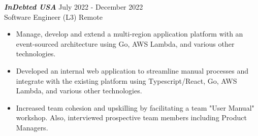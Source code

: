 {\sl \textbf{InDebted USA}} \hfill July 2022 - December 2022 \\ Software Engineer (L3) \hfill Remote
\begin{itemize}
    \item Manage, develop and extend a multi-region application platform with an event-sourced architecture using Go, AWS Lambda, and various other technologies.
    \item Developed an internal web application to streamline manual processes and integrate with the existing platform using Typescript/React, Go, AWS Lambda, and various other technologies.
    \item Increased team cohesion and upskilling by facilitating a team "User Manual" workshop. Also, interviewed prospective team members including Product Managers.
\end{itemize}
